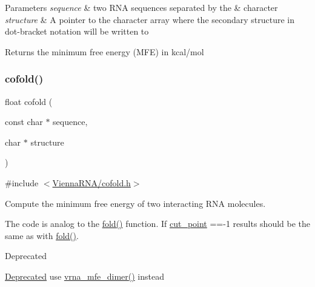 \begin{DoxyParams}{Parameters}
{\em sequence} & two R\+NA sequences separated by the \textquotesingle{}\&\textquotesingle{} character \\
\hline
{\em structure} & A pointer to the character array where the secondary structure in dot-\/bracket notation will be written to \\
\hline
\end{DoxyParams}
\begin{DoxyReturn}{Returns}
the minimum free energy (M\+FE) in kcal/mol 
\end{DoxyReturn}
\mbox{\label{group__mfe__cofold_gabc8517f22cfe70595ee81fc837910d52}} 
\subsubsection{\texorpdfstring{cofold()}{cofold()}}
{\footnotesize\ttfamily float cofold (\begin{DoxyParamCaption}\item[{const char $\ast$}]{sequence,  }\item[{char $\ast$}]{structure }\end{DoxyParamCaption})}



{\ttfamily \#include $<$\hyperlink{cofold_8h}{Vienna\+R\+N\+A/cofold.\+h}$>$}



Compute the minimum free energy of two interacting R\+NA molecules. 

The code is analog to the \hyperlink{group__mfe__fold__single_gaadafcb0f140795ae62e5ca027e335a9b}{fold()} function. If \hyperlink{fold__vars_8h_ab9b2c3a37a5516614c06d0ab54b97cda}{cut\+\_\+point} ==-\/1 results should be the same as with \hyperlink{group__mfe__fold__single_gaadafcb0f140795ae62e5ca027e335a9b}{fold()}.

\begin{DoxyRefDesc}{Deprecated}
\item[\hyperlink{deprecated__deprecated000030}{Deprecated}]use \hyperlink{group__mfe__cofold_gaab22d10c1190f205f16a77cab9d5d3ee}{vrna\+\_\+mfe\+\_\+dimer()} instead\end{DoxyRefDesc}



